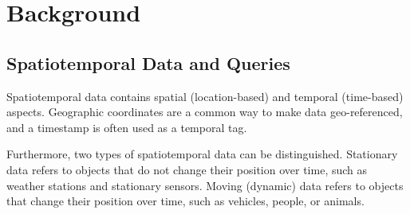 \section{Background}
\label{cha:background}

\subsection{Spatiotemporal Data and Queries}
Spatiotemporal data contains spatial (location-based) and temporal (time-based) aspects.
Geographic coordinates are a common way to make data geo-referenced, and a timestamp is often used as a temporal tag. \cite{alamSurveySpatiotemporalData2022}

Furthermore, two types of spatiotemporal data can be distinguished.
Stationary data refers to objects that do not change their position over time, such as weather stations and stationary sensors.
Moving (dynamic) data refers to objects that change their position over time, such as vehicles, people, or animals.


